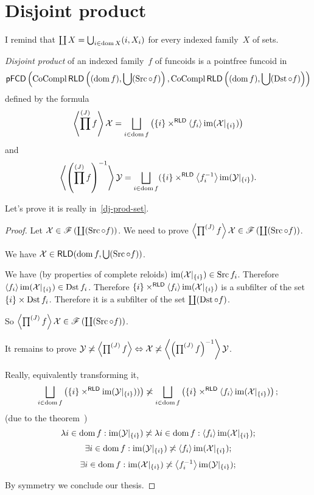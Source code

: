 \chapter{Disjoint product}

I remind that
$\coprod X = \bigcup_{i\in\operatorname{dom} X} (i,X_i)$
for every indexed family~$X$ of sets.

\begin{defn}
\emph{Disjoint product} of an indexed family~$f$ of funcoids is
a pointfree funcoid in
\begin{equation}\label{dj-prod-set}
\mathsf{pFCD}\left(\operatorname{CoCompl}\mathsf{RLD}\left((\operatorname{dom} f),\bigcup(\operatorname{Src}\circ f)\right), \operatorname{CoCompl}\mathsf{RLD}\left((\operatorname{dom} f),\bigcup(\operatorname{Dst}\circ f)\right)\right)
\end{equation}
defined by the formula
\[
\supfun{\prod^{(J)}f} \mathcal{X} =
\bigsqcup_{i\in\dom f}
\left(\{i\}\times^{\mathsf{RLD}}\supfun{f_i}\im(\mathcal{X}|_{\{i\}})\right)
\]
and
\[
\supfun{\left(\prod^{(J)}f\right)^{-1}} \mathcal{Y} =
\bigsqcup_{i\in\dom f}
(\{i\}\times^{\mathsf{RLD}}\supfun{f_i^{-1}}\im(\mathcal{Y}|_{\{i\}}).
\]
\end{defn}

Let's prove it is really in~\eqref{dj-prod-set}.

\begin{proof}
Let $\mathcal{X}\in\mathscr{F}\left(\coprod(\operatorname{Src}\circ f)\right)$.
We need to prove
$\left\langle \prod^{(J)}f\right\rangle \mathcal{X}\in\mathscr{F}\left(\coprod(\operatorname{Src}\circ f)\right)$.

We have $\mathcal{X}\in\mathsf{RLD}(\operatorname{dom} f, \bigcup(\operatorname{Src}\circ f))$.

We have (by properties of complete reloids) $\operatorname{im}(\mathcal{X}|_{\{i\}})\in\operatorname{Src} f_i$. Therefore $\left\langle f_i\right\rangle\operatorname{im}(\mathcal{X}|_{\{i\}})\in\operatorname{Dst} f_i$. Therefore
$\{i\}\times^{\mathsf{RLD}}\left\langle f_i\right\rangle\operatorname{im}(\mathcal{X}|_{\{i\}})$ is a subfilter of the set $\{i\}\times\operatorname{Dst} f_i$. Therefore it is a subfilter of the set $\coprod(\operatorname{Dst}\circ f)$.

So $\left\langle \prod^{(J)}f\right\rangle \mathcal{X}\in\mathscr{F}\left(\coprod(\operatorname{Src}\circ f)\right)$.

It remains to prove
$\mathcal{Y}\not\asymp\left\langle \prod^{(J)}f\right\rangle \Leftrightarrow
\mathcal{X}\not\asymp\left\langle \left(\prod^{(J)}f\right)^{-1}\right\rangle \mathcal{Y}$.

Really, equivalently transforming it, \[ \bigsqcup_{i\in\dom f}
\left(\{i\}\times^{\mathsf{RLD}}\im(\mathcal{Y}|_{\{i\}}))\right) \nasymp \bigsqcup_{i\in\dom f}
\left(\{i\}\times^{\mathsf{RLD}}\supfun{f_i}\im(\mathcal{X}|_{\{i\}})\right); \]
(due to the theorem~)
\[
\lambda i\in\operatorname{dom} f:\operatorname{im}(\mathcal{Y}|_{\{i\}}) \not\asymp
\lambda i\in\operatorname{dom} f:\left\langle f_i\right\rangle\operatorname{im}(\mathcal{X}|_{\{i\}});
\]
\[
\exists i\in\operatorname{dom} f:\operatorname{im}(\mathcal{Y}|_{\{i\}}) \not\asymp
\left\langle f_i\right\rangle\operatorname{im}(\mathcal{X}|_{\{i\}});
\]
\[
\exists i\in\operatorname{dom} f:\operatorname{im}(\mathcal{X}|_{\{i\}}) \not\asymp
\left\langle f_i^{-1}\right\rangle\operatorname{im}(\mathcal{Y}|_{\{i\}});
\]

By symmetry we conclude our thesis.
\end{proof}


